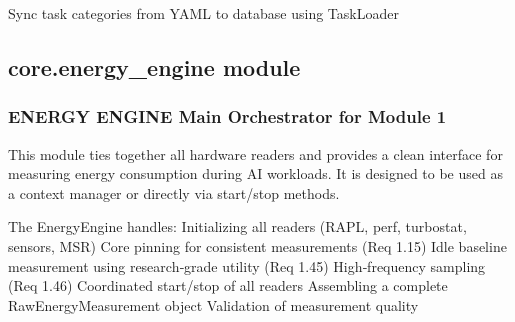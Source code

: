 \documentclass[letterpaper,10pt,english]{sphinxmanual}
\begin{document}
\begin{fulllineitems}
\begin{fulllineitems}
\end{fulllineitems}


\begin{fulllineitems}
\label{\detokenize{core.config_loader:core.config_loader.ConfigLoader.sync_task_categories}}
\pysigstartsignatures
\pysiglinewithargsret
{}
{}
{}
\pysigstopsignatures
\sphinxAtStartPar
Sync task categories from YAML to database using TaskLoader

\end{fulllineitems}


\end{fulllineitems}


\sphinxstepscope


\subsection{core.energy\_engine module}
\label{\detokenize{core.energy_engine:module-core.energy_engine}}\label{\detokenize{core.energy_engine:core-energy-engine-module}}\label{\detokenize{core.energy_engine::doc}}

\subsubsection{ENERGY ENGINE \textendash{} Main Orchestrator for Module 1}
\label{\detokenize{core.energy_engine:energy-engine-main-orchestrator-for-module-1}}
\sphinxAtStartPar
This module ties together all hardware readers and provides a clean interface
for measuring energy consumption during AI workloads. It is designed to be used
as a context manager or directly via start/stop methods.

\sphinxAtStartPar
The EnergyEngine handles:
\sphinxhyphen{} Initializing all readers (RAPL, perf, turbostat, sensors, MSR)
\sphinxhyphen{} Core pinning for consistent measurements (Req 1.15)
\sphinxhyphen{} Idle baseline measurement using research‑grade utility (Req 1.45)
\sphinxhyphen{} High‑frequency sampling (Req 1.46)
\sphinxhyphen{} Coordinated start/stop of all readers
\sphinxhyphen{} Assembling a complete RawEnergyMeasurement object
\sphinxhyphen{} Validation of measurement quality
\end{document}
